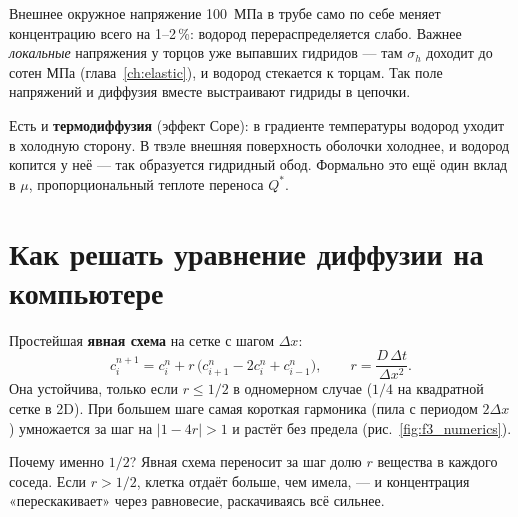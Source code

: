 
\begin{zrbox}
Внешнее окружное напряжение 100~МПа в трубе само по себе меняет концентрацию всего на 1--2\,\%: водород
перераспределяется слабо. Важнее \emph{локальные} напряжения у торцов уже выпавших гидридов --- там $\sigma_h$
доходит до сотен МПа (глава~\ref{ch:elastic}), и водород стекается к торцам. Так поле напряжений и диффузия вместе
выстраивают гидриды в цепочки.
\end{zrbox}

Есть и \textbf{термодиффузия} (эффект Соре): в градиенте температуры водород уходит в холодную сторону. В твэле
внешняя поверхность оболочки холоднее, и водород копится у неё --- так образуется гидридный обод. Формально это
ещё один вклад в $\mu$, пропорциональный теплоте переноса $Q^*$.

\section{Как решать уравнение диффузии на компьютере}

Простейшая \textbf{явная схема} на сетке с шагом $\Delta x$:
\begin{equation}
c_i^{n+1} = c_i^n + r\,\bigl(c_{i+1}^n - 2c_i^n + c_{i-1}^n\bigr),\qquad r = \frac{D\,\Delta t}{\Delta x^2}.
\end{equation}
Она устойчива, только если $r \le 1/2$ в одномерном случае ($1/4$ на квадратной сетке в 2D). При большем шаге
самая короткая гармоника (пила с периодом $2\Delta x$) умножается за шаг на $|1-4r| > 1$ и растёт без предела
(рис.~\ref{fig:f3_numerics}).


\begin{idea}
Почему именно $1/2$? Явная схема переносит за шаг долю $r$ вещества в каждого соседа. Если $r > 1/2$, клетка
отдаёт больше, чем имела, --- и концентрация «перескакивает» через равновесие, раскачиваясь всё сильнее.
\end{idea}

